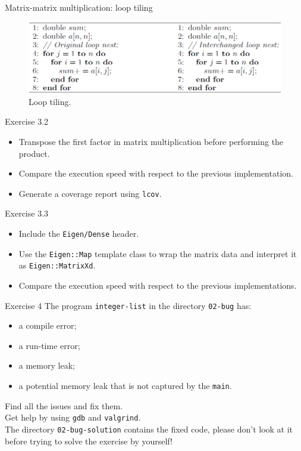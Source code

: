\documentclass[10pt]{beamer}
\begin{document}
\begin{frame}{Matrix-matrix multiplication: loop tiling}
    \begin{figure}
        \centering
        \includegraphics[width=\textwidth]{images/loop_tiling.png}
        \caption{Loop tiling.}
    \end{figure}
\end{frame}

\begin{frame}{Exercise 3.2}
    \begin{itemize}
        \item Transpose the first factor in matrix multiplication before performing the product.
        \item Compare the execution speed with respect to the previous implementation.
        \item Generate a coverage report using \texttt{lcov}.
    \end{itemize}
\end{frame}

\begin{frame}{Exercise 3.3}
    \begin{itemize}
        \item Include the \texttt{Eigen/Dense} header.
        \item Use the \texttt{Eigen::Map} template class to wrap the matrix data and interpret it as \texttt{Eigen::MatrixXd}.
        \item Compare the execution speed with respect to the previous implementations.
    \end{itemize}
\end{frame}

\begin{frame}{Exercise 4}
The program \texttt{integer-list} in the directory \texttt{02-bug} has:

\begin{itemize}
    \item a compile error;
    \item a run-time error;
    \item a memory leak;
    \item a potential memory leak that is not captured by the \texttt{main}.
\end{itemize}
\vspace{0.5cm}
Find all the issues and fix them. \\[3mm]

Get help by using \texttt{gdb} and \texttt{valgrind}.\\[3mm]

The directory \texttt{02-bug-solution} contains the fixed code,
please don't look at it before trying to solve the exercise by yourself!
\end{frame}
\end{document}
